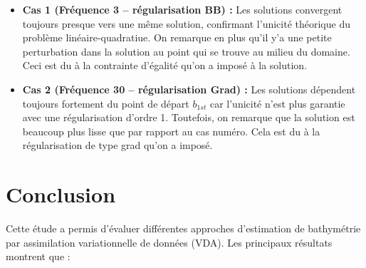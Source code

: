 \documentclass{article}
\begin{document}
\begin{itemize}
    \item \textbf{Cas 1 (Fréquence 3 – régularisation BB) :}  
    Les solutions convergent toujours presque vers une même solution, confirmant l’unicité théorique du problème linéaire-quadratiue. On remarque en plus qu'il y'a une petite perturbation dans la solution au point qui se trouve au milieu du domaine. Ceci est du à la contrainte d'égalité qu'on a imposé à la solution.

    \item \textbf{Cas 2 (Fréquence 30 – régularisation Grad) :}  
    Les solutions dépendent toujours fortement du point de départ \( b_{1st} \) car l’unicité n’est plus garantie avec une régularisation d’ordre 1. Toutefois, on remarque que la solution est beaucoup plus lisse que par rapport au cas numéro. Cela est du à la régularisation de type grad qu'on a imposé.
\end{itemize}




\section{Conclusion}

Cette étude a permis d'évaluer différentes approches d'estimation de bathymétrie par assimilation variationnelle de données (VDA). Les principaux résultats montrent que :
\end{document}
